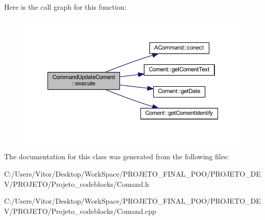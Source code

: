 Here is the call graph for this function\-:\nopagebreak
\begin{figure}[H]
\begin{center}
\leavevmode
\includegraphics[width=350pt]{class_command_update_coment_a77c2f791e6b04b249fc7fbb36b66bf0a_cgraph}
\end{center}
\end{figure}




The documentation for this class was generated from the following files\-:\begin{DoxyCompactItemize}
\item 
C\-:/\-Users/\-Vitor/\-Desktop/\-Work\-Space/\-P\-R\-O\-J\-E\-T\-O\-\_\-\-F\-I\-N\-A\-L\-\_\-\-P\-O\-O/\-P\-R\-O\-J\-E\-T\-O\-\_\-\-D\-E\-V/\-P\-R\-O\-J\-E\-T\-O/\-Projeto\-\_\-codeblocks/Comand.\-h\item 
C\-:/\-Users/\-Vitor/\-Desktop/\-Work\-Space/\-P\-R\-O\-J\-E\-T\-O\-\_\-\-F\-I\-N\-A\-L\-\_\-\-P\-O\-O/\-P\-R\-O\-J\-E\-T\-O\-\_\-\-D\-E\-V/\-P\-R\-O\-J\-E\-T\-O/\-Projeto\-\_\-codeblocks/Comand.\-cpp\end{DoxyCompactItemize}
